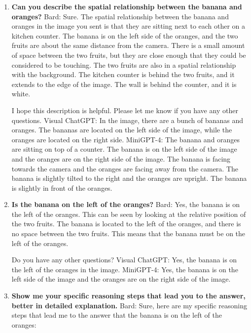     \begin{enumerate}
        \item \textbf{Can you describe the spatial relationship between the banana and oranges?}
        \subitem 
        Bard: Sure. The spatial relationship between the banana and oranges in the image you sent is that they are sitting next to each other on a kitchen counter. The banana is on the left side of the oranges, and the two fruits are about the same distance from the camera. There is a small amount of space between the two fruits, but they are close enough that they could be considered to be touching.
        The two fruits are also in a spatial relationship with the background. The kitchen counter is behind the two fruits, and it extends to the edge of the image. The wall is behind the counter, and it is white.

        I hope this description is helpful. Please let me know if you have any other questions.
        \subitem Visual ChatGPT: In the image, there are a bunch of bananas and oranges. The bananas are located on the left side of the image, while the oranges are located on the right side.
        \subitem MiniGPT-4: The banana and oranges are sitting on top of a counter. The banana is on the left side of the image and the oranges are on the right side of the image. The banana is facing towards the camera and the oranges are facing away from the camera. The banana is slightly tilted to the right and the oranges are upright. The banana is slightly in front of the oranges.
        \item \textbf{Is the banana on the left of the oranges?}
        \subitem Bard:
        Yes, the banana is on the left of the oranges. This can be seen by looking at the relative position of the two fruits. The banana is located to the left of the oranges, and there is no space between the two fruits. This means that the banana must be on the left of the oranges.
        
        Do you have any other questions?
        \subitem Visual ChatGPT: Yes, the banana is on the left of the oranges in the image.
        \subitem MiniGPT-4: Yes, the banana is on the left side of the image and the oranges are on the right side of the image.
        \item \textbf{Show me your specific reasoning steps that lead you to the answer, better in detailed explanation.}
        \subitem Bard: Sure, here are my specific reasoning steps that lead me to the answer that the banana is on the left of the oranges:


\end{enumerate}
